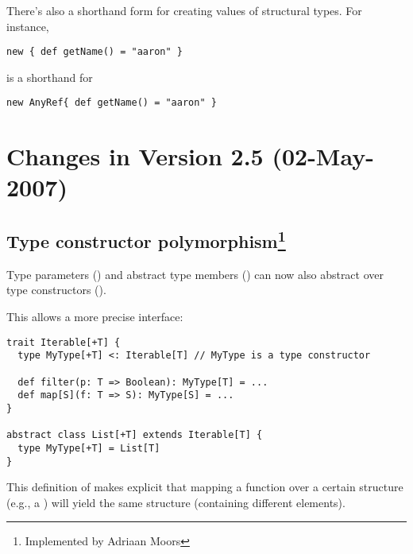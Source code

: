 There's also a shorthand form for creating values of structural
types. For instance,
\begin{lstlisting}
new { def getName() = "aaron" }
\end{lstlisting}
is a shorthand for 
\begin{lstlisting}
new AnyRef{ def getName() = "aaron" }
\end{lstlisting}

\section*{Changes in Version 2.5 (02-May-2007)}

\subsection*{Type constructor polymorphism\footnote{Implemented by Adriaan Moors}}
Type parameters () and abstract type members () can now also abstract over type constructors ().

This allows a more precise \lstinline@Iterable@ interface:
\begin{lstlisting}
trait Iterable[+T] {
  type MyType[+T] <: Iterable[T] // MyType is a type constructor

  def filter(p: T => Boolean): MyType[T] = ...
  def map[S](f: T => S): MyType[S] = ...
}

abstract class List[+T] extends Iterable[T] {
  type MyType[+T] = List[T]
}
\end{lstlisting}

This definition of \lstinline@Iterable@ makes explicit that mapping a function
 over a certain structure (e.g., a \lstinline@List@) will yield the same structure (containing different elements).

